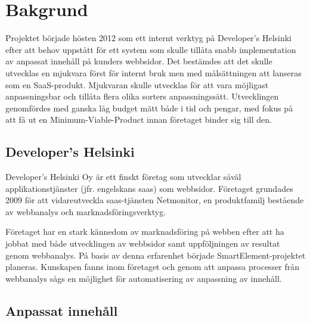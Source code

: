 \section{Bakgrund}

Projektet började hösten 2012 som ett internt verktyg på Developer's Helsinki efter att behov uppstått för ett system som skulle tillåta snabb implementation av anpassat innehåll på kunders webbsidor. Det bestämdes att det skulle utvecklas en mjukvara först för internt bruk men med målsättningen att lanseras som en SaaS-produkt. Mjukvaran skulle utvecklas för att vara möjligast anpassningsbar och tillåta flera olika sorters anpassningssätt. Utvecklingen genomfördes med ganska låg budget mätt både i tid och pengar, med fokus på att få ut en Minimum-Viable-Product innan företaget binder sig till den.

\subsection{Developer's Helsinki}

Developer's Helsinki Oy är ett finskt företag som utvecklar såväl applikationstjänster (jfr. engelskans \gls{saas}) som webbsidor. Företaget grundades 2009 för att vidareutveckla  \gls{saas}-tjänsten Netmonitor, en produktfamilj bestående av webbanalys och marknadsföringsverktyg.

Företaget har en stark kännedom av marknadsföring på webben efter att ha jobbat med både utvecklingen av webbsidor samt uppföljningen av resultat genom webbanalys. På basis av denna erfarenhet började SmartElement-projektet planeras. Kunskapen fanns inom företaget och genom att anpassa processer från webbanalys sågs en möjlighet för automatisering av anpassning av innehåll.

\subsection{Anpassat innehåll}

